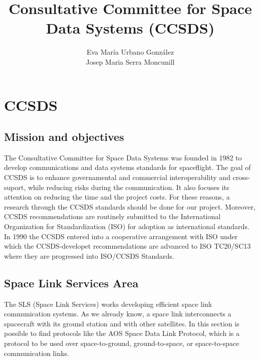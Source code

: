 \documentclass[12pt,a4paper]{report}
\author{Eva María Urbano González\\
Josep Maria Serra Moncunill}
\title{Consultative Committee for Space Data Systems (CCSDS)}
\begin{document}
\maketitle
\section{CCSDS}
\subsection{Mission and objectives}
The Consultative Committee for Space Data Systems was founded in 1982 to develop communications and data systems standards for spaceflight. The goal of CCSDS is to enhance governamental and commercial interoperability and cross-suport, while reducing risks during the communication. It also focuses its attention on reducing the time and the project costs.  For these reasons, a research through the CCSDS standards should be done for our project. Moreover, CCSDS recommendations are routinely submitted to the International Organization for Standardization (ISO) for adoption as international standards. In 1990 the CCSDS entered into a cooperative arrangement with ISO under which the CCSDS-developet recommendations are advanced to ISO TC20/SC13 where they are progressed into ISO/CCSDS Standards. 
\subsection{Space Link Services Area}
The SLS (Space Link Services) works developing efficient space link communication systems. As we already know, a space link interconnects a spacecraft with its ground station and with other satellites. In this section is possible to find protocols like the AOS Space Data Link Protocol, which is a protocol to be used over space-to-ground, ground-to-space, or space-to-space communication links.\cite{CC2006}  


\end{document}
